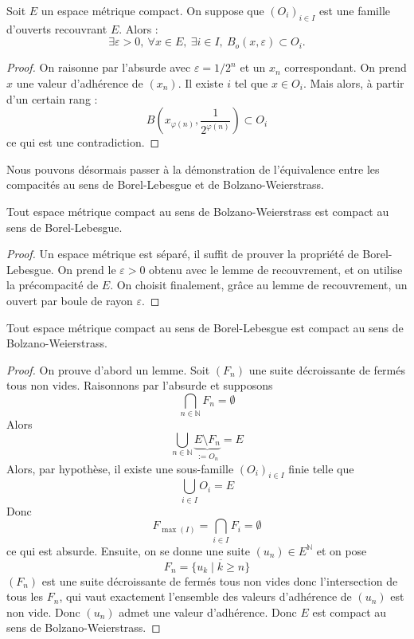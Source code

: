 \documentclass[french]{article}
\newcommand{\N}{\mathbb{N}}
\theoremstyle{plain}
\theoremstyle{definition}
\theoremstyle{remark}
\begin{document}
\begin{lem}%
	Soit $E$ un espace métrique compact. On suppose que $(O_i)_{i\in I}$ est une famille d'ouverts recouvrant $E$. Alors : $$\exists\varepsilon >0,\ \forall x\in E,\ \exists i\in I,\ B_o(x,\varepsilon)\subset O_i.$$
\end{lem}
\begin{proof}
	On raisonne par l'absurde avec $\varepsilon=1/2^n$ et un $x_n$ correspondant. On prend $x$ une valeur d'adhérence de $(x_n)$. Il existe $i$ tel que $x\in O_i$. Mais alors, à partir d'un certain rang : $$B\left(x_{\varphi(n)},\frac{1}{2^{\varphi(n)}}\right)\subset O_i$$ ce qui est une contradiction.
\end{proof}

Nous pouvons désormais passer à la démonstration de l'équivalence entre les compacités au sens de Borel-Lebesgue et de Bolzano-Weierstrass.

\begin{thm}%
	Tout espace métrique compact au sens de Bolzano-Weierstrass est compact au sens de Borel-Lebesgue.
\end{thm}
\begin{proof}
	Un espace métrique est séparé, il suffit de prouver la propriété de Borel-Lebesgue. On prend le $\varepsilon>0$ obtenu avec le lemme de recouvrement, et on utilise la précompacité de $E$. On choisit finalement, grâce au lemme de recouvrement, un ouvert par boule de rayon $\varepsilon$.
\end{proof}

\begin{thm}%
	Tout espace métrique compact au sens de Borel-Lebesgue est compact au sens de Bolzano-Weierstrass.
\end{thm}
\begin{proof}
	On prouve d'abord un lemme. Soit $(F_n)$ une suite décroissante de fermés tous non vides. Raisonnons par l'absurde et supposons $$\bigcap_{n\in\N} F_n=\emptyset$$ Alors $$\bigcup_{n\in\N}\underbrace{E\setminus F_n}_{:=O_n}=E$$ Alors, par hypothèse, il existe une sous-famille $(O_i)_{i\in I}$ finie telle que $$\bigcup_{i\in I}O_i=E$$ Donc $$F_{\max(I)}=\bigcap_{i\in I}F_i=\emptyset$$ ce qui est absurde. Ensuite, on se donne une suite $(u_n)\in E^\N$ et on pose $$F_n=\overline{\{u_k\mid k\geqslant n\}}$$ $(F_n)$ est une suite décroissante de fermés tous non vides donc l'intersection de tous les $F_n$, qui vaut exactement l'ensemble des valeurs d'adhérence de $(u_n)$ est non vide. Donc $(u_n)$ admet une valeur d'adhérence. Donc $E$ est compact au sens de Bolzano-Weierstrass.
\end{proof}
\end{document}
